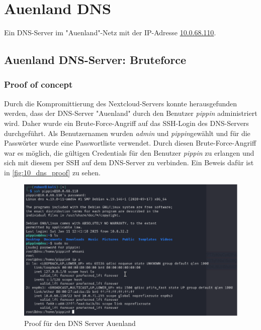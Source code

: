\chapter{Auenland DNS}
Ein DNS-Server im "Auenland"-Netz mit der IP-Adresse \url{	10.0.68.110}. \\


\section{\makecvssbadge Auenland DNS-Server: Bruteforce}
\subsection*{Proof of concept}
Durch die Kompromittierung des Nextcloud-Servers konnte herausgefunden werden, dass der DNS-Server "Auenland" durch den Benutzer \textit{pippin} administriert wird. Daher wurde ein Brute-Force-Angriff auf das SSH-Login des DNS-Servers durchgeführt. Als Benutzernamen wurden \textit{admin} und \textit{pippin}gewählt und für die Passwörter wurde eine Passwortliste verwendet. Durch diesen Brute-Force-Angriff war es möglich, die gültigen Credentials für den Benutzer \textit{pippin} zu erlangen und sich mit diesem per SSH auf dem DNS-Server zu verbinden. Ein Beweis dafür ist in \autoref{fig:10_dns_proof} zu sehen.\\

\begin{figure}[!ht]
    \centering
    \includegraphics[width=\linewidth]{images/proofs/10_dns_proof.png}
    \caption{Proof für den DNS Server Auenland}
    \label{fig:10_dns_proof}
\end{figure}

